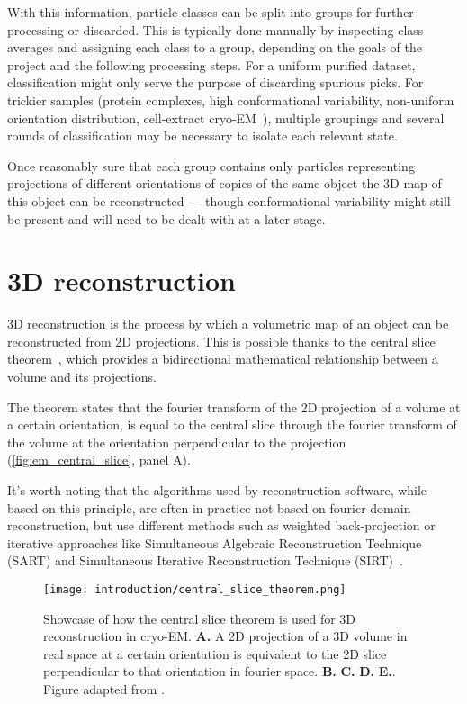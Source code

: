 With this information, particle classes can be split into groups for further processing or discarded.
This is typically done manually by inspecting class averages and assigning each class to a group, depending on the goals of the project and the following processing steps.
For a uniform purified dataset, classification might only serve the purpose of discarding spurious picks.
For trickier samples (protein complexes, high conformational variability, non-uniform orientation distribution, cell-extract cryo-EM~\cite{suBuildRetrieveMethodology2021,kyrilisIntegrativeBiologyNative2019}), multiple groupings and several rounds of classification may be necessary to isolate each relevant state.

Once reasonably sure that each group contains only particles representing projections of different orientations of copies of the same object the 3D map of this object can be reconstructed --- though conformational variability might still be present and will need to be dealt with at a later stage.

\section{3D reconstruction}\label{em_reconstruction}

3D reconstruction is the process by which a volumetric map of an object can be reconstructed from 2D projections.
This is possible thanks to the central slice theorem~\cite{wikipediaProjectionsliceTheorem2023}, which provides a bidirectional mathematical relationship between a volume and its projections.

The theorem states that the fourier transform of the 2D projection of a volume at a certain orientation, is equal to the central slice through the fourier transform of the volume at the orientation perpendicular to the projection (\autoref{fig:em_central_slice}, panel A).

It's worth noting that the algorithms used by reconstruction software, while based on this principle, are often in practice not based on fourier-domain reconstruction, but use different methods such as weighted back-projection or iterative approaches like Simultaneous Algebraic Reconstruction Technique (SART) and Simultaneous Iterative Reconstruction Technique (SIRT)~\cite{andersenSimultaneousAlgebraicReconstruction1984,agulleiroFastTomographicReconstruction2011,wikipediaTomographicReconstruction2024}.

\begin{figure}[ht]
    \centering
    \texttt{[image: introduction/central\_slice\_theorem.png]}
    \caption[Central slice theorem]{Showcase of how the central slice theorem is used for 3D reconstruction in cryo-EM. \textbf{A.} A 2D projection of a 3D volume in real space at a certain orientation is equivalent to the 2D slice perpendicular to that orientation in fourier space. \textbf{B.} \textbf{C.} \textbf{D.} \textbf{E.}. Figure adapted from \citet{nogalesCryoEMUniqueTool2015}.}
    \label{fig:em_central_slice}
\end{figure}

